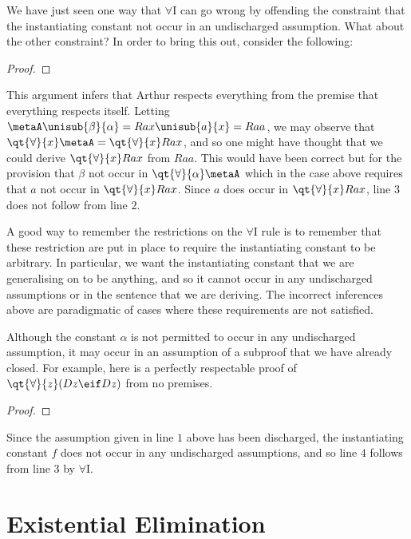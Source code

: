 We have just seen one way that $\forall$I can go wrong by offending the constraint that the instantiating constant not occur in an undischarged assumption.
What about the other constraint?
In order to bring this out, consider the following:

\begin{proof}
	 \pr{}
	 
   
\end{proof}

This argument infers that Arthur respects everything from the premise that everything respects itself.
Letting $\metaA\unisub{\beta}{\alpha}=Rax\unisub{a}{x}=Raa$, we may observe that $\qt{\forall}{x}\metaA=\qt{\forall}{x}Rax$, and so one might have thought that we could derive $\qt{\forall}{x}Rax$ from $Raa$.
This would have been correct but for the provision that $\beta$ not occur in $\qt{\forall}{\alpha}\metaA$ which in the case above requires that $a$ not occur in $\qt{\forall}{x}Rax$.
Since $a$ does occur in $\qt{\forall}{x}Rax$, line $3$ does not follow from line $2$.

A good way to remember the restrictions on the $\forall$I rule is to remember that these restriction are put in place to require the instantiating constant to be arbitrary.
In particular, we want the instantiating constant that we are generalising on to be anything, and so it cannot occur in any undischarged assumptions or in the sentence that we are deriving.
The incorrect inferences above are paradigmatic of cases where these requirements are not satisfied.

Although the constant $\alpha$ is not permitted to occur in any undischarged assumption, it may occur in an assumption of a subproof that we have already closed.
For example, here is a perfectly respectable proof of $\qt{\forall}{z}(Dz \eif Dz)$ from no premises.

\begin{proof}
	\open
		 \as{}
		 
	\close
\end{proof}

Since the assumption given in line $1$ above has been discharged, the instantiating constant $f$ does not occur in any undischarged assumptions, and so line $4$ follows from line $3$ by $\forall$I. 



\section{Existential Elimination}
  \label{sec:ExistElim}

